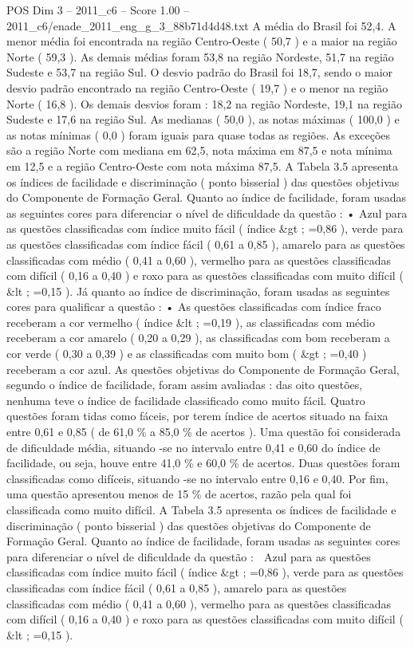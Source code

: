 \begin{textsample}{POS Dim 3 – 2011\_c6 – Score 1.00 – 2011\_c6/enade\_2011\_eng\_g\_3\_88b71d4d48.txt}
A média do Brasil foi 52,4.
A menor média foi encontrada na região Centro-Oeste ( 50,7 ) e a maior na região Norte ( 59,3 ).
As demais médias foram 53,8 na região Nordeste, 51,7 na região Sudeste e 53,7 na região Sul.
O desvio padrão do Brasil foi 18,7, sendo o maior desvio padrão encontrado na região Centro-Oeste ( 19,7 ) e o menor na região Norte ( 16,8 ).
Os demais desvios foram : 18,2 na região Nordeste, 19,1 na região Sudeste e 17,6 na região Sul.
As medianas ( 50,0 ), as notas máximas ( 100,0 ) e as notas mínimas ( 0,0 ) foram iguais para quase todas as regiões.
As exceções são a região Norte com mediana em 62,5, nota máxima em 87,5 e nota mínima em 12,5 e a região Centro-Oeste com nota máxima 87,5.
A Tabela 3.5 apresenta os índices de facilidade e discriminação ( ponto bisserial ) das questões objetivas do Componente de Formação Geral.
Quanto ao índice de facilidade, foram usadas as seguintes cores para diferenciar o nível de dificuldade da questão : • Azul para as questões classificadas com índice muito fácil ( índice \&gt ; =0,86 ), verde para as questões classificadas com índice fácil ( 0,61 a 0,85 ), amarelo para as questões classificadas com médio ( 0,41 a 0,60 ), vermelho para as questões classificadas com difícil ( 0,16 a 0,40 ) e roxo para as questões classificadas com muito difícil ( \&lt ; =0,15 ).
Já quanto ao índice de discriminação, foram usadas as seguintes cores para qualificar a questão : • As questões classificadas com índice fraco receberam a cor vermelho ( índice \&lt ; =0,19 ), as classificadas com médio receberam a cor amarelo ( 0,20 a 0,29 ), as classificadas com bom receberam a cor verde ( 0,30 a 0,39 ) e as classificadas com muito bom ( \&gt ; =0,40 ) receberam a cor azul.
As questões objetivas do Componente de Formação Geral, segundo o índice de facilidade, foram assim avaliadas : das oito questões, nenhuma teve o índice de facilidade classificado como muito fácil.
Quatro questões foram tidas como fáceis, por terem índice de acertos situado na faixa entre 0,61 e 0,85 ( de 61,0 \% a 85,0 \% de acertos ).
Uma questão foi considerada de dificuldade média, situando -se no intervalo entre 0,41 e 0,60 do índice de facilidade, ou seja, houve entre 41,0 \% e 60,0 \% de acertos.
Duas questões foram classificadas como difíceis, situando -se no intervalo entre 0,16 e 0,40.
Por fim, uma questão apresentou menos de 15 \% de acertos, razão pela qual foi classificada como muito difícil.
A Tabela 3.5 apresenta os índices de facilidade e discriminação ( ponto bisserial ) das questões objetivas do Componente de Formação Geral.
Quanto ao índice de facilidade, foram usadas as seguintes cores para diferenciar o nível de dificuldade da questão :  Azul para as questões classificadas com índice muito fácil ( índice \&gt ; =0,86 ), verde para as questões classificadas com índice fácil ( 0,61 a 0,85 ), amarelo para as questões classificadas com médio ( 0,41 a 0,60 ), vermelho para as questões classificadas com difícil ( 0,16 a 0,40 ) e roxo para as questões classificadas com muito difícil ( \&lt ; =0,15 ).

\end{textsample}
